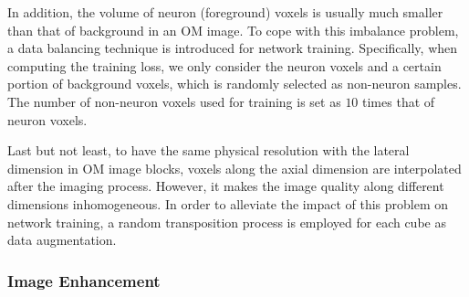 In addition, the volume of neuron (foreground) voxels is usually much smaller than that of background in an OM image.
To cope with this imbalance problem, a data balancing technique is introduced for network training.
Specifically, when computing the training loss, we only consider the neuron voxels and a certain portion of background voxels, which is randomly selected as non-neuron samples.
The number of non-neuron voxels used for training is set as $10$ times that of neuron voxels.

Last but not least, to have the same physical resolution with the lateral dimension in OM image blocks, voxels along the axial dimension are interpolated after the imaging process. However, it makes the image quality along different dimensions inhomogeneous. In order to alleviate the impact of this problem on network training, a random transposition process is employed for each cube as data augmentation.


\subsubsection{Image Enhancement}
\label{sec:enhancement}

